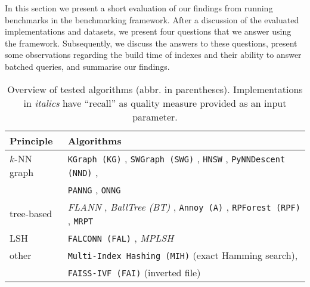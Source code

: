 In this section we present a short evaluation of our findings from running
benchmarks in the benchmarking framework. After a discussion of the evaluated
implementations and datasets, we present four questions that we answer
using the framework. Subsequently, we discuss the answers to
these questions, present some observations regarding the build time of
indexes and their ability to answer batched queries, and summarise our
findings.

\begin{table}[t]
    \begin{tabular}{l l}
        \textbf{Principle} & \textbf{Algorithms} \\ \hline \hline 
        $k$-NN graph & \texttt{KGraph (KG)} \cite{kgraph}, \texttt{SWGraph (SWG)} \cite{swgraph,nmslib}, \texttt{HNSW} \cite{hnsw,nmslib}, \texttt{PyNNDescent (NND)} \cite{pynndescent}, \\
                     & \texttt{PANNG} \cite{ngt,Iwasaki16}, \texttt{ONNG} \cite{ngt, Iwasaki18} \\
        tree-based & \textit{FLANN} \cite{flann}, \textit{BallTree (BT)} \cite{nmslib}, \texttt{Annoy (A)} \cite{annoy}, \texttt{RPForest (RPF)} \cite{rpforest}, \texttt{MRPT} \cite{Hyvonen2016} \\
        LSH & \texttt{FALCONN (FAL)} \cite{falconn}, \textit{MPLSH} \cite{mplsh,nmslib}%
        \\
        
    other %
              & \texttt{Multi-Index Hashing (MIH)} \cite{mihalgo} (exact Hamming search), \\
              & \texttt{FAISS-IVF (FAI)} \cite{faiss} (inverted file)
    \end{tabular}
    \caption{Overview of tested algorithms (abbr. in parentheses). Implementations in \textit{italics} have ``recall'' as quality measure
     provided as an input parameter.} 
    \label{tab:algorithms}
    
\end{table}

